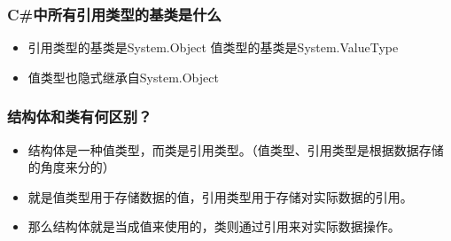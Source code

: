 \documentclass[9pt, b5paper]{article}
\begin{document}
\subsubsection{C\#中所有引用类型的基类是什么}
\label{sec:org23fab09}
\begin{itemize}
\item 引用类型的基类是System.Object 值类型的基类是System.ValueType
\item 值类型也隐式继承自System.Object
\end{itemize}

\subsubsection{结构体和类有何区别？}
\label{sec:org772f3a9}
\begin{itemize}
\item 结构体是一种值类型，而类是引用类型。（值类型、引用类型是根据数据存储的角度来分的）
\item 就是值类型用于存储数据的值，引用类型用于存储对实际数据的引用。
\item 那么结构体就是当成值来使用的，类则通过引用来对实际数据操作。
\end{itemize}
\end{document}

